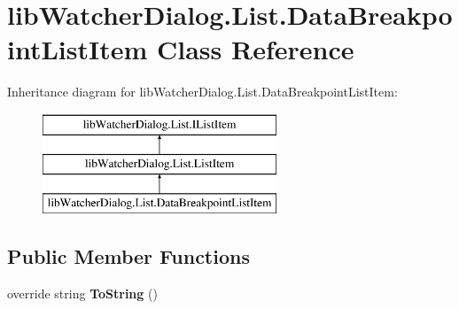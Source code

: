 \hypertarget{classlib_watcher_dialog_1_1_list_1_1_data_breakpoint_list_item}{\section{lib\+Watcher\+Dialog.\+List.\+Data\+Breakpoint\+List\+Item Class Reference}
\label{classlib_watcher_dialog_1_1_list_1_1_data_breakpoint_list_item}
}
Inheritance diagram for lib\+Watcher\+Dialog.\+List.\+Data\+Breakpoint\+List\+Item\+:\begin{figure}[H]
\begin{center}
\leavevmode
\includegraphics[height=3.000000cm]{classlib_watcher_dialog_1_1_list_1_1_data_breakpoint_list_item}
\end{center}
\end{figure}
\subsection*{Public Member Functions}
\begin{DoxyCompactItemize}
\item 
\hypertarget{classlib_watcher_dialog_1_1_list_1_1_data_breakpoint_list_item_a3708504363e66a5b0aeb606d79486d05}{override string {\bfseries To\+String} ()}\label{classlib_watcher_dialog_1_1_list_1_1_data_breakpoint_list_item_a3708504363e66a5b0aeb606d79486d05}

\end{DoxyCompactItemize}
